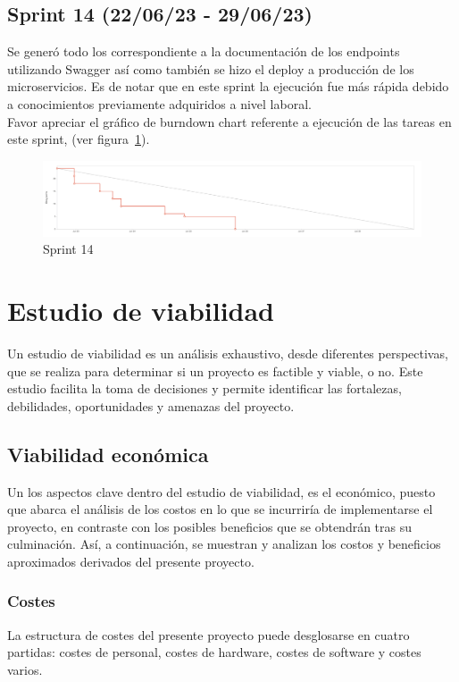 \subsection{Sprint 14 (22/06/23 - 29/06/23)}\label{sprint-0-220623---290623}
Se generó todo los correspondiente a la documentación de los endpoints utilizando Swagger así como también se hizo el deploy a producción de los microservicios. Es de notar que en este sprint la ejecución fue más rápida debido a conocimientos previamente adquiridos a nivel laboral. \\
Favor apreciar el gráfico de burndown chart referente a ejecución de las tareas en este sprint, (ver figura~\ref{Img:Sprint+14}).
\begin{figure}[h]
    \centering
    \includegraphics[width=1.0\textwidth]{img/sprint/sprint14.png}
    \caption{Sprint 14} \label{Img:Sprint+14}
\end{figure} 

\section{Estudio de viabilidad}
Un estudio de viabilidad es un análisis exhaustivo, desde diferentes perspectivas, que se realiza para determinar si un proyecto es factible y viable, o no. Este estudio facilita la toma de decisiones y permite identificar las fortalezas, debilidades, oportunidades y amenazas del proyecto.

\subsection{Viabilidad económica}
Un los aspectos clave dentro del estudio de viabilidad, es el económico, puesto que abarca el análisis de los costos en lo que se incurriría de implementarse el proyecto, en contraste con los posibles beneficios que se obtendrán tras su culminación. Así, a continuación, se muestran y analizan los costos y beneficios aproximados derivados del presente proyecto.

\subsubsection{Costes}
La estructura de costes del presente proyecto puede desglosarse en cuatro partidas: costes de personal, costes de hardware, costes de software y costes varios.
